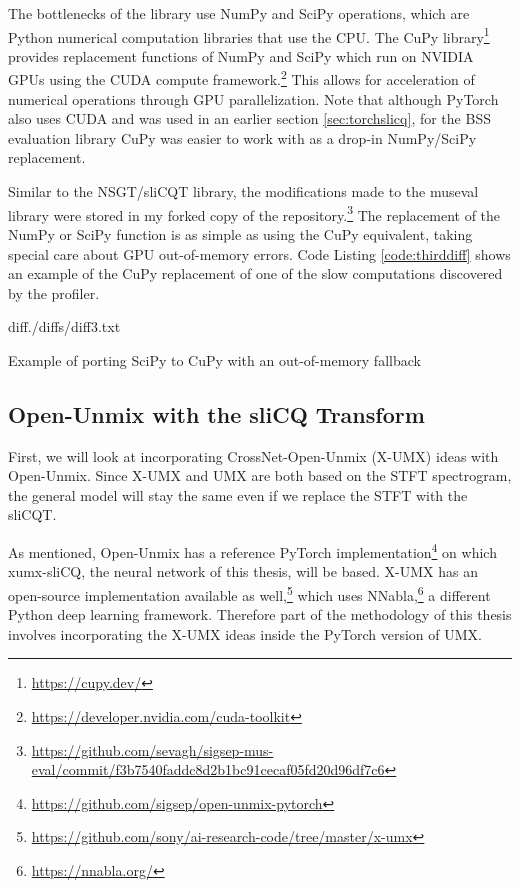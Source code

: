 \documentclass[report.tex]{subfiles}
\begin{document}
The bottlenecks of the library use NumPy and SciPy operations, which are Python numerical computation libraries that use the CPU. The CuPy library\footnote{\url{https://cupy.dev/}} provides replacement functions of NumPy and SciPy which run on NVIDIA GPUs using the CUDA compute framework.\footnote{\url{https://developer.nvidia.com/cuda-toolkit}} This allows for acceleration of numerical operations through GPU parallelization. Note that although PyTorch \parencite{pytorch} also uses CUDA and was used in an earlier section \ref{sec:torchslicq}, for the BSS evaluation library CuPy was easier to work with as a drop-in NumPy/SciPy replacement.

Similar to the NSGT/sliCQT library, the modifications made to the museval library were stored in my forked copy of the repository.\footnote{\url{https://github.com/sevagh/sigsep-mus-eval/commit/f3b7540faddc8d2b1bc91cecaf05fd20d96df7c6}} The replacement of the NumPy or SciPy function is as simple as using the CuPy equivalent, taking special care about GPU out-of-memory errors. Code Listing \ref{code:thirddiff} shows an example of the CuPy replacement of one of the slow computations discovered by the profiler.

\begin{listing}[ht]
  \centering
\begin{inputminted}[linenos,breaklines,frame=single,fontsize=\scriptsize]{diff}{./diffs/diff3.txt}
\end{inputminted}
  \caption{Example of porting SciPy to CuPy with an out-of-memory fallback}
  \label{code:thirddiff}
\end{listing}

\newpagefill

\subsection{Open-Unmix with the sliCQ Transform}
\label{sec:slicqumx}

First, we will look at incorporating CrossNet-Open-Unmix (X-UMX) \parencite{xumx} ideas with Open-Unmix. Since X-UMX and UMX are both based on the STFT spectrogram, the general model will stay the same even if we replace the STFT with the sliCQT.

As mentioned, Open-Unmix \parencite{umx} has a reference PyTorch implementation\footnote{\url{https://github.com/sigsep/open-unmix-pytorch}} on which xumx-sliCQ, the neural network of this thesis, will be based. X-UMX has an open-source implementation available as well,\footnote{\url{https://github.com/sony/ai-research-code/tree/master/x-umx}} which uses NNabla,\footnote{\url{https://nnabla.org/}} a different Python deep learning framework. Therefore part of the methodology of this thesis involves incorporating the X-UMX ideas inside the PyTorch version of UMX.
\end{document}
